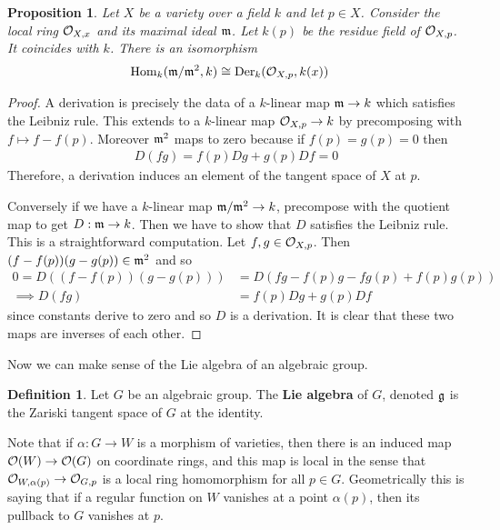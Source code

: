 \documentclass{amsart}
\numberwithin{equation}{section}
\theoremstyle{plain} %
\newtheorem{proposition}[equation]{Proposition}
\theoremstyle{definition}
\newtheorem{definition}[equation]{Definition}
\theoremstyle{remark}
\begin{document}
\hfill

\begin{proposition}
	Let $X$ be a variety over a field $k$ and let $p\in X$. Consider
    the local ring ${\mathcal{O}}_{X,x}$ and its maximal ideal $\mathfrak{m}$. Let $k(p)$
    be the residue field of ${\mathcal{O}}_{X,p}$. It coincides with $k$.
	There is an isomorphism \begin{align*}
		\operatorname{Hom}_k(\mathfrak{m}/\mathfrak{m}^2,k) & \cong \operatorname{Der}_k({\mathcal{O}}_{X,p},k(x))
	\end{align*}
\end{proposition}

\begin{proof}
	A derivation is precisely the data of a $k$-linear map $\mathfrak{m} \to k$ which satisfies the Leibniz rule.
	This extends to a $k$-linear map ${\mathcal{O}}_{X,p}\to k$ by precomposing with $f\mapsto f - f(p)$.
	Moreover $\mathfrak{m}^2$ maps to zero because if $f(p) = g(p) = 0$ then \begin{align*}
		D(fg) = f(p)Dg + g(p)Df = 0
	\end{align*} Therefore, a derivation induces an element of the tangent space of $X$ at $p$.

	\hfill

	Conversely if we have a $k$-linear map $\mathfrak{m}/\mathfrak{m}^2\to k$, precompose with the quotient map to get
	$D:\mathfrak{m}\to k$. Then we have to show that $D$ satisfies the Leibniz rule. This is a straightforward computation.
	Let $f,g\in {\mathcal{O}}_{X,p}$. Then $(f-f(p))(g-g(p)) \in \mathfrak{m}^2$ and so \begin{align*}
		0 = D((f-f(p))(g-g(p))) & = D(fg - f(p)g - fg(p) + f(p)g(p)) \\
		\implies D(fg)          & = f(p)Dg + g(p)Df
	\end{align*} since constants derive to zero and so $D$ is a derivation.
    It is clear that these two maps are inverses of each other.
\end{proof}

Now we can make sense of the Lie algebra of an algebraic group.
\begin{definition}
	Let $G$ be an algebraic group. The \textbf{Lie algebra} of $G$, denoted $\mathfrak{g}$
	is the Zariski tangent space of $G$ at the identity.
\end{definition}

Note that if $\alpha: G\to W$ is a morphism of varieties, then there is an induced
map ${\mathcal{O}}(W) \to {\mathcal{O}}(G)$ on coordinate rings, and this map is local in the sense that
${\mathcal{O}}_{W,\alpha(p)}\to {\mathcal{O}}_{G,p}$ is a local ring homomorphism for all $p\in G$. Geometrically
this is saying that if a regular function on $W$ vanishes at a point $\alpha(p)$,
then its pullback to $G$ vanishes at $p$.
\end{document}

